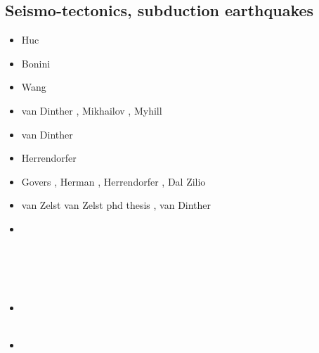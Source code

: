 \begin{scriptsize}
\cite{raju91}
\cite{haeh93}
\cite{leru95}
\cite{duto98}
\cite{wade03}
\cite{wade04}
\cite{utne08}
\end{scriptsize}

\subsection{Seismo-tectonics, subduction earthquakes}

\begin{scriptsize}
\begin{itemize}
\item[\nineteenninetyeight] Huc \etal \cite{huhc98}
\item[\twothousandthree] Bonini \etal \cite{bocs03}
\item[\twothousandtwelve] Wang \etal \cite{wahh12}
\item[\twothousandthirteen] van Dinther \etal \cite{vagd13a,vagd13b}, Mikhailov \cite{milp13},
                            Myhill \cite{myhi13}
\item[\twothousandfourteen] van Dinther \etal \cite{vamd14}
\item[\twothousandfifteen] Herrendorfer \etal \cite{hevg15}
\item[\twothousandeighteen] Govers \etal \cite{gofv18}, Herman \etal \cite{hefg18}, 
                            Herrendorfer \etal \cite{hegv18}, Dal Zilio \etal \cite{davg18}
\item[\twothousandnineteen] van Zelst \etal \cite{vawg19} van Zelst phd thesis \cite{vanzelst},
                            van Dinther \etal \cite{vakf19}
\item[\twothousandtwenty] 
\textcite{brvf20} \\
\textcite{pegy20} \\
\textcite{dadm20} \\
\textcite{mabb20} \\
\textcite{hego20} \\
\item[\twothousandtwentyone] 
\textcite{jamp21} \\
\textcite{begc21} \\
\item[\twothousandtwentytwo] 
\textcite{toyp22} 
\end{itemize}
\end{scriptsize}

